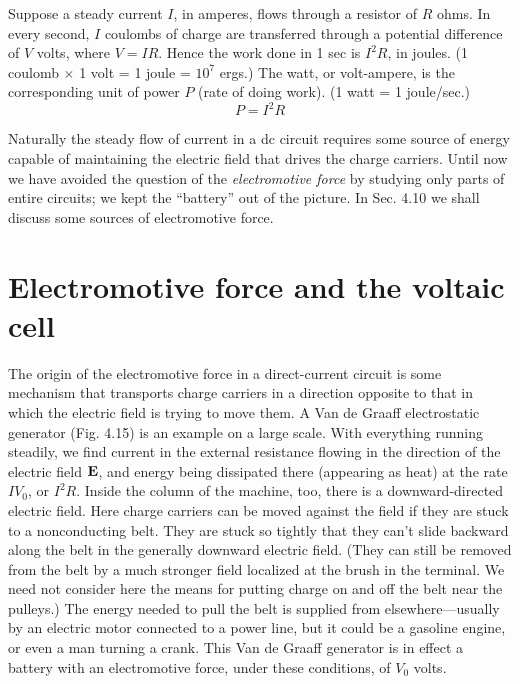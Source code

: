 Suppose a steady current $I$, in amperes, flows through a resistor
of $R$ ohms. In every second, $I$ coulombs of charge are transferred
through a potential difference of $V$ volts, where $V = IR$. Hence the
work done in 1 sec is $I^2R$, in joules. (1 coulomb $\times$ 1 volt = 1 joule =
$10^7$ ergs.) The watt, or volt-ampere, is the corresponding unit of
power $P$ (rate of doing work). (1 watt = 1 joule/sec.)
\begin{equation}
  P = I^2 R
\end{equation}

Naturally the steady flow of current in a dc circuit requires some
source of energy capable of maintaining the electric field that drives
the charge carriers. Until now we have avoided the question of the
\emph{electromotive force}
by studying only parts of entire circuits; we kept
the ``battery'' out of the picture. In Sec. 4.10 we shall discuss some
sources of electromotive force.

\section{Electromotive force and the voltaic cell}

The origin of the electromotive force in a direct-current circuit is
some mechanism that transports charge carriers in a direction opposite
to that in which the electric field is trying to move them.
A Van de Graaff electrostatic generator (Fig. 4.15) is an example on
a large scale. With everything running steadily, we find current in
the external resistance flowing in the direction of the electric field $\mathbf{E}$,
and energy being dissipated there (appearing as heat) at the rate
$I V_0$, or $I^2R$. Inside the column of the machine, too, there is a 
downward-directed electric field. Here charge carriers can be moved
against the field if they are stuck to a nonconducting belt. They are
stuck so tightly that they can't slide backward along the belt in the
generally downward electric field. (They can still be removed from
the belt by a much stronger field localized at the brush in the 
terminal. We need not consider here the means for putting charge on and
off the belt near the pulleys.) The energy needed to pull the belt is
supplied from elsewhere---usually by an electric motor connected to
a power line, but it could be a gasoline engine, or even a man turning
a crank. This Van de Graaff generator is in effect a battery with an
electromotive force, under these conditions, of $V_0$ volts.

